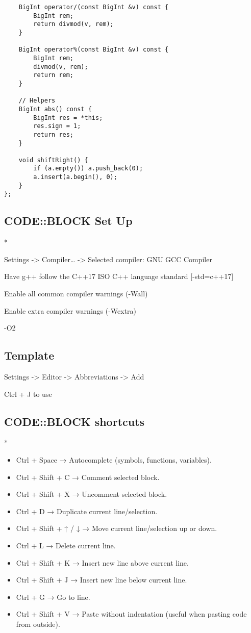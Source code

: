 \documentclass[11pt,a4paper]{article}
\begin{document}
\begin{multicols*}{2}
\begin{lstlisting}
    BigInt operator/(const BigInt &v) const {
        BigInt rem;
        return divmod(v, rem);
    }

    BigInt operator%(const BigInt &v) const {
        BigInt rem;
        divmod(v, rem);
        return rem;
    }

    // Helpers
    BigInt abs() const {
        BigInt res = *this;
        res.sign = 1;
        return res;
    }

    void shiftRight() {
        if (a.empty()) a.push_back(0);
        a.insert(a.begin(), 0);
    }
};

\end{lstlisting}

\subsection{CODE::BLOCK Set Up}
*

Settings -> Compiler… -> Selected compiler: GNU GCC Compiler

Have g++ follow the C++17 ISO C++ language standard [-std=c++17]

Enable all common compiler warnings (-Wall)

Enable extra compiler warnings (-Wextra)

-O2

\subsection{Template}

Settings -> Editor -> Abbreviations -> Add

Ctrl + J to use

\subsection{CODE::BLOCK shortcuts}
*

\begin{itemize}
    \item Ctrl + Space → Autocomplete (symbols, functions, variables).
    \item Ctrl + Shift + C → Comment selected block.
    \item Ctrl + Shift + X → Uncomment selected block.
    \item Ctrl + D → Duplicate current line/selection.
    \item Ctrl + Shift + ↑ / ↓ → Move current line/selection up or down.
    \item Ctrl + L → Delete current line.
    \item Ctrl + Shift + K → Insert new line above current line.
    \item Ctrl + Shift + J → Insert new line below current line.
    \item Ctrl + G → Go to line.
    \item Ctrl + Shift + V → Paste without indentation (useful when pasting code from outside).
\end{itemize}

\end{multicols*}
\end{document}
